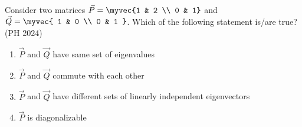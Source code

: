 \item Consider two matrices $\vec{P} = \myvec {1 & 2 \\ 0 & 1} $ and $\vec{Q} = \myvec{ 1 & 0 \\ 0 & 1 }$.
Which of the following statement is/are true?
\hfill (PH 2024)
\begin{enumerate}
    \item $\vec{P}$ and $\vec{Q}$ have same set of eigenvalues
    \item $\vec{P}$ and $\vec{Q}$ commute with each other
    \item $\vec{P}$ and $\vec{Q}$ have different sets of linearly independent eigenvectors
    \item $\vec{P}$ is diagonalizable
\end{enumerate}
